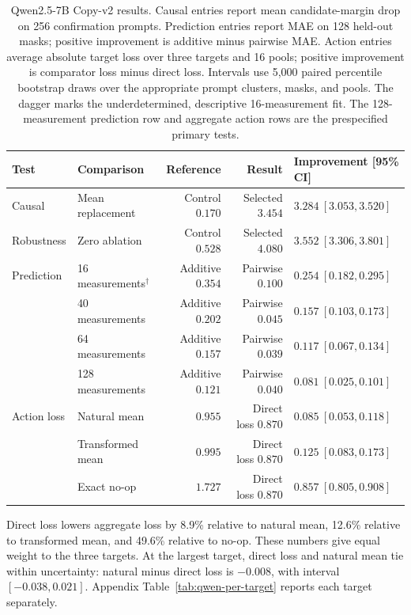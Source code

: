 \begin{table}[H]
\centering
\scriptsize
\setlength{\tabcolsep}{3.5pt}
\begin{tabular}{@{}llrrl@{}}
\toprule
Test & Comparison & Reference & Result & Improvement [95\% CI] \\
\midrule
Causal & Mean replacement & Control $0.170$ & Selected $3.454$
  & $3.284\ [3.053,3.520]$ \\
Robustness & Zero ablation & Control $0.528$ & Selected $4.080$
  & $3.552\ [3.306,3.801]$ \\
\midrule
Prediction & 16 measurements$^\dagger$ & Additive $0.354$ & Pairwise $0.100$
  & $0.254\ [0.182,0.295]$ \\
& 40 measurements & Additive $0.202$ & Pairwise $0.045$
  & $0.157\ [0.103,0.173]$ \\
& 64 measurements & Additive $0.157$ & Pairwise $0.039$
  & $0.117\ [0.067,0.134]$ \\
& 128 measurements & Additive $0.121$ & Pairwise $0.040$
  & $0.081\ [0.025,0.101]$ \\
\midrule
Action loss & Natural mean & $0.955$ & Direct loss $0.870$
  & $0.085\ [0.053,0.118]$ \\
& Transformed mean & $0.995$ & Direct loss $0.870$
  & $0.125\ [0.083,0.173]$ \\
& Exact no-op & $1.727$ & Direct loss $0.870$
  & $0.857\ [0.805,0.908]$ \\
\bottomrule
\end{tabular}
\caption{Qwen2.5-7B Copy-v2 results. Causal entries report mean
candidate-margin drop on 256 confirmation prompts. Prediction entries report MAE on 128
held-out masks; positive improvement is additive minus pairwise MAE. Action
entries average absolute target loss over three targets and 16 pools; positive
improvement is comparator loss minus direct loss. Intervals use 5,000 paired
percentile bootstrap draws over the appropriate prompt clusters, masks, and
pools. The dagger marks the underdetermined, descriptive 16-measurement fit.
The 128-measurement prediction row and aggregate action rows are the
prespecified primary tests.}
\label{tab:qwen-copy-v2}
\end{table}

Direct loss lowers aggregate loss by 8.9\% relative to natural mean, 12.6\%
relative to transformed mean, and 49.6\% relative to no-op. These numbers give
equal weight to the three targets. At the largest target, direct loss and
natural mean tie within uncertainty: natural minus direct loss is $-0.008$,
with interval $[-0.038,0.021]$. Appendix
Table~\ref{tab:qwen-per-target} reports each target separately.

